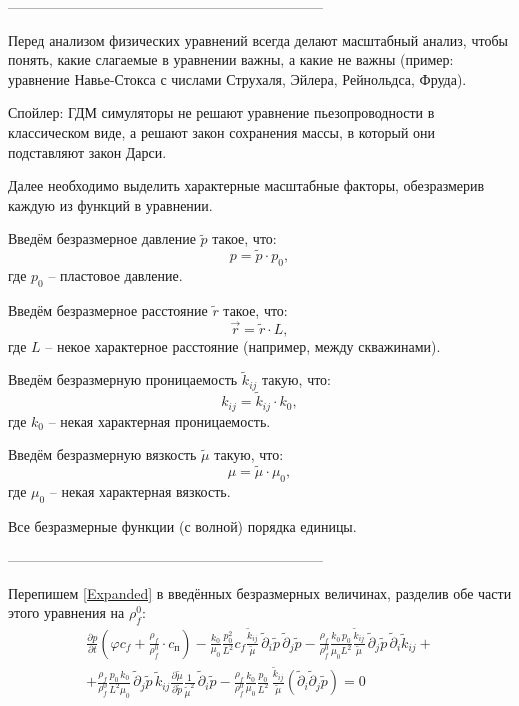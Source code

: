 \documentclass[a4paper,12pt]{article}
\newcommand{\beq}{\begin{equation}}
\newcommand{\eeq}{\end{equation}}
\begin{document}
--------------------------------------------------------------------

Перед анализом физических уравнений всегда делают масштабный анализ, чтобы понять, какие слагаемые в уравнении важны, а какие не важны (пример: уравнение Навье-Стокса с числами Струхаля, Эйлера, Рейнольдса, Фруда).

Спойлер: ГДМ симуляторы не решают уравнение пьезопроводности в классическом виде, а решают закон сохранения массы, в который они подставляют закон Дарси.

Далее необходимо выделить характерные масштабные факторы, обезразмерив каждую из функций в уравнении.

Введём безразмерное давление $\tilde{p}$ такое, что:
\beq
p=\tilde{p}\cdot p_0,
\eeq
где $p_0$ -- пластовое давление.

Введём безразмерное расстояние $\tilde{r}$ такое, что:
\beq
\vec{r}=\tilde{r}\cdot L,
\eeq
где $L$ -- некое характерное расстояние (например, между скважинами).

Введём безразмерную проницаемость $\tilde{k}_{ij}$ такую, что:
\beq
k_{ij}=\tilde{k}_{ij}\cdot k_0,
\eeq
где $k_0$ -- некая характерная проницаемость.

Введём безразмерную вязкость $\tilde{\mu}$ такую, что:
\beq
\mu=\tilde{\mu}\cdot\mu_0,
\eeq
где $\mu_0$ -- некая характерная вязкость.

Все безразмерные функции (с волной) порядка единицы.

--------------------------------------------------------------------

Перепишем \eqref{Expanded} в введённых безразмерных величинах, разделив обе части этого уравнения на $\rho_f^0$:
\begin{multline}
\frac{\partial p}{\partial t}\left(\varphi c_f+\frac{\rho_f}{\rho_f^0}\cdot c_\text{п}\right)-\frac{k_0}{\mu_0}\frac{p_0^2}{L^2}c_f\frac{\tilde{k}_{ij}}{\tilde{\mu}}\,\tilde{\partial}_i\tilde{p}\,\tilde{\partial}_j\tilde{p}-\frac{\rho_f}{\rho_f^0}\frac{k_0\,p_0}{\mu_0L^2}\frac{\tilde{k}_{ij}}{\tilde{\mu}}\,\tilde{\partial}_j\tilde{p}\,\tilde{\partial}_i\tilde{k}_{ij}+\\+\frac{\rho_f}{\rho_f^0}\frac{p_0\,k_0}{L^2\mu_0}\,\tilde{\partial}_j\tilde{p}\,\tilde{k}_{ij}\frac{\partial\tilde{\mu}}{\partial\tilde{p}}\frac{1}{\tilde{\mu}^2}\,\tilde{\partial}_i\tilde{p}-\frac{\rho_f}{\rho_f^0}\frac{k_0}{\mu_0}\frac{p_0}{L^2}\,\frac{\tilde{k}_{ij}}{\tilde{\mu}}\left(\tilde{\partial}_i\tilde{\partial}_j\tilde{p}\right)=0
\end{multline}
\end{document}

